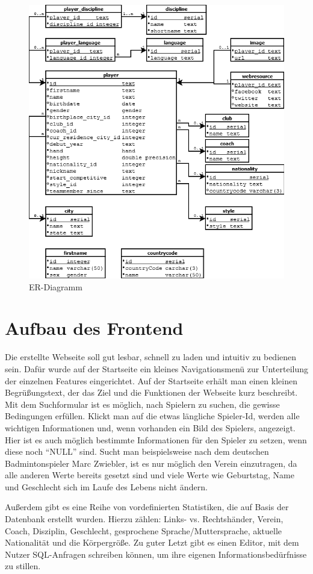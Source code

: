 \begin{figure}[H]
\centering
\includegraphics[width=1\textwidth] {ER-Diagramm} 
\caption{ER-Diagramm}
\label{fig:ER-Diagramm}
\end{figure}

\section{Aufbau des Frontend}
\label{Frontend}
Die erstellte Webseite soll gut lesbar, schnell zu laden und intuitiv zu bedienen sein. Dafür wurde auf der Startseite ein kleines Navigationsmenü zur Unterteilung der einzelnen Features eingerichtet. Auf der Startseite erhält man einen kleinen Begrüßungstext, der das Ziel und die Funktionen der Webseite kurz beschreibt. Mit dem Suchformular ist es möglich, nach Spielern zu suchen, die gewisse Bedingungen erfüllen. Klickt man auf die etwas längliche Spieler-Id, werden alle wichtigen Informationen und, wenn vorhanden ein Bild des Spielers, angezeigt. Hier ist es auch möglich bestimmte Informationen für den Spieler zu setzen, wenn diese noch "`NULL"' sind. Sucht man beispielsweise nach dem deutschen Badmintonspieler Marc Zwiebler, ist es nur möglich den Verein einzutragen, da alle anderen Werte bereits gesetzt sind und viele Werte wie Geburtstag, Name und Geschlecht sich im Laufe des Lebens nicht ändern.

Außerdem gibt es eine Reihe von vordefinierten Statistiken, die auf Basis der Datenbank erstellt wurden. Hierzu zählen:
Links- vs. Rechtshänder, Verein, Coach, Disziplin, Geschlecht, gesprochene Sprache/Muttersprache, aktuelle Nationalität und die Körpergröße. Zu guter Letzt gibt es einen Editor, mit dem Nutzer SQL-Anfragen schreiben können, um ihre eigenen Informationsbedürfnisse zu stillen.